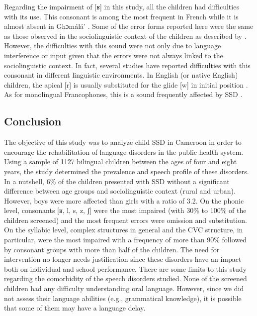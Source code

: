 \documentclass[output=paper,newtxmath,modfonts,nonflat,draftmode]{langsci/langscibook}
\begin{document}
Regarding the impairment of [ʁ] in this study, all the children had difficulties with its use. This consonant is among the most frequent in French \citep{Peytard1970} while it is almost absent in Ghɔmálá’ \citep{Mba1995}. Some of the error forms reported here were the same as those observed in the sociolinguistic context of the children as described by \citet{Biloa2004}. However, the difficulties with this sound were not only due to language interference or input given that the errors were not always linked to the sociolinguistic context. In fact, several studies have reported difficulties with this consonant in different linguistic environments. In English (or native English) children, the apical [r] is usually substituted for the glide [w] in initial position \citep{Bowen2014}. As for monolingual Francophones, this is a sound frequently affected by SSD \cite{MaurinCherou1993}.

\subsection{Conclusion} %

The objective of this study was to analyze child SSD in Cameroon in order to encourage the rehabilitation of language disorders in the public health system. Using a sample of 1127 bilingual children between the ages of four and eight years, the study determined the prevalence and speech profile of these disorders. In a nutshell, 6\% of the children presented with SSD without a significant difference between age groups and sociolinguistic context (rural and urban). However, boys were more affected than girls with a ratio of 3.2. On the phonic level, consonants [ʁ, l, s, z, ʃ] were the most impaired (with 30\% to 100\% of the children screened) and the most frequent errors were omission and substitution. On the syllabic level, complex structures in general and the CVC structure, in particular, were the most impaired with a frequency of more than 90\% followed by consonant groups with more than half of the children. The need for intervention no longer needs justification since these disorders have an impact both on individual and school performance. There are some limits to this study regarding the comorbidity of the speech disorders studied. None of the screened children had any difficulty understanding oral language. However, since we did not assess their language abilities (e.g., grammatical knowledge), it is possible that some of them may have a language delay.
 
\end{document}
